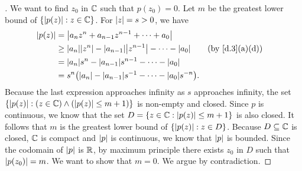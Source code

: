 \begin{proof}[]
  We want to find \(z_0\) in \(\mathbb{C}\) such that \(p(z_0) = 0\).
  Let \(m\) be the greatest lower bound of \(\left\lbrace\left\lvert p(z)\right\rvert : z \in \mathbb{C}\right\rbrace\).
  For \(\left\lvert z\right\rvert = s > 0\), we have
  \begin{align*}
    \abs{p(z)} & = \abs{a_n z^n + a_{n - 1} z^{n - 1} + \cdots + a_0}                                               \\
               & \geq \abs{a_n} \abs{z^n} - \abs{a_{n - 1}} \abs{z^{n - 1}} - \cdots - \abs{a_0} &  & \by{d.3}[a,d] \\
               & = \abs{a_n} s^n - \abs{a_{n - 1}} s^{n - 1} - \cdots - \abs{a_0}                                   \\
               & = s^{n} \pa{\abs{a_n} - \abs{a_{n - 1}} s^{-1} - \cdots - \abs{a_0} s^{-n}}.
  \end{align*}
  Because the last expression approaches infinity as \(s\) approaches infinity, the set \(\left\lbrace\left\lvert p(z)\right\rvert : (z \in \mathbb{C}) \land (\left\lvert p(z)\right\rvert \leq m + 1)\right\rbrace\) is non-empty and closed.
  Since \(p\) is continuous, we know that the set \(D = \left\lbrace z \in \mathbb{C} : \left\lvert p(z)\right\rvert \leq m + 1\right\rbrace\) is also closed.
  It follows that \(m\) is the greatest lower bound of \(\left\lbrace\left\lvert p(z)\right\rvert : z \in D\right\rbrace\).
  Because \(D \subseteq \mathbb{C}\) is closed, \(\mathbb{C}\) is compact and \(\left\lvert p\right\rvert\) is continuous, we know that \(\left\lvert p\right\rvert\) is bounded.
  Since the codomain of \(\left\lvert p\right\rvert\) is \(\mathbb{R}\), by maximum principle there exists \(z_0\) in \(D\) such that \(\left\lvert p(z_0)\right\rvert = m\).
  We want to show that \(m = 0\).
  We argue by contradiction.


\end{proof}

